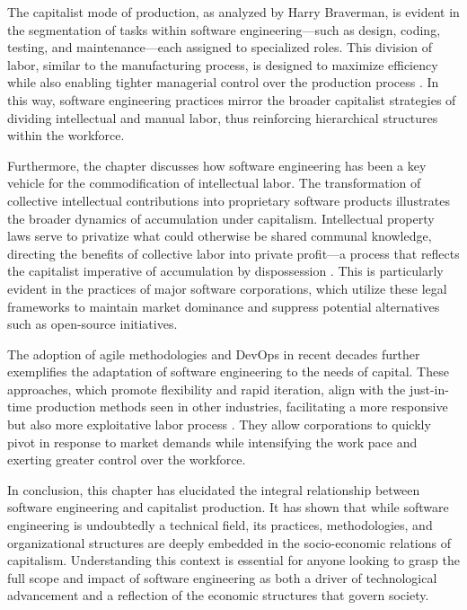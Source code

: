 \begin{refsection}
The capitalist mode of production, as analyzed by Harry Braverman, is evident in the segmentation of tasks within software engineering—such as design, coding, testing, and maintenance—each assigned to specialized roles. This division of labor, similar to the manufacturing process, is designed to maximize efficiency while also enabling tighter managerial control over the production process \cite[pp.~78-83]{braverman1974labor}. In this way, software engineering practices mirror the broader capitalist strategies of dividing intellectual and manual labor, thus reinforcing hierarchical structures within the workforce.

Furthermore, the chapter discusses how software engineering has been a key vehicle for the commodification of intellectual labor. The transformation of collective intellectual contributions into proprietary software products illustrates the broader dynamics of accumulation under capitalism. Intellectual property laws serve to privatize what could otherwise be shared communal knowledge, directing the benefits of collective labor into private profit—a process that reflects the capitalist imperative of accumulation by dispossession \cite[pp.~45-49]{harvey2003accumulation}. This is particularly evident in the practices of major software corporations, which utilize these legal frameworks to maintain market dominance and suppress potential alternatives such as open-source initiatives.

The adoption of agile methodologies and DevOps in recent decades further exemplifies the adaptation of software engineering to the needs of capital. These approaches, which promote flexibility and rapid iteration, align with the just-in-time production methods seen in other industries, facilitating a more responsive but also more exploitative labor process \cite[pp.~190-195]{marx1867capital}. They allow corporations to quickly pivot in response to market demands while intensifying the work pace and exerting greater control over the workforce.

In conclusion, this chapter has elucidated the integral relationship between software engineering and capitalist production. It has shown that while software engineering is undoubtedly a technical field, its practices, methodologies, and organizational structures are deeply embedded in the socio-economic relations of capitalism. Understanding this context is essential for anyone looking to grasp the full scope and impact of software engineering as both a driver of technological advancement and a reflection of the economic structures that govern society.

\printbibliography[heading=subbibliography]

\end{refsection}